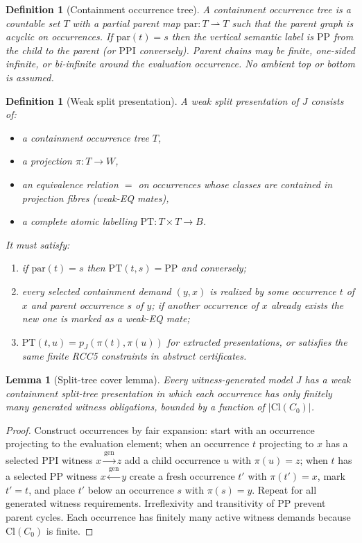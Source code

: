 \documentclass[11pt]{article}
\newcommand{\PP}{\mathrm{PP}}
\newcommand{\PPI}{\mathrm{PPI}}
\newcommand{\Cl}{\mathrm{Cl}}
\newtheorem{lemma}[theorem]{Lemma}
\newtheorem{definition}[theorem]{Definition}
\begin{document}
\begin{definition}[Containment occurrence tree]
A containment occurrence tree is a countable set $T$ with a partial parent map
$\mathrm{par}:T\rightharpoonup T$ such that the parent graph is acyclic on
occurrences. If $\mathrm{par}(t)=s$ then the vertical semantic label is
$\PP$ from the child to the parent (or $\PPI$ conversely).
Parent chains may be finite, one-sided infinite, or bi-infinite around the
evaluation occurrence. No ambient top or bottom is assumed.
\end{definition}

\begin{definition}[Weak split presentation]
A weak split presentation of $J$ consists of:
\begin{itemize}
  \item a containment occurrence tree $T$,
  \item a projection $\pi:T\to W$,
  \item an equivalence relation $=$ on occurrences whose classes are contained
    in projection fibres (weak-EQ mates),
  \item a complete atomic labelling $\mathrm{PT}:T\times T\to B$.
\end{itemize}
It must satisfy:
\begin{enumerate}[label=(S\arabic*)]
  \item if $\mathrm{par}(t)=s$ then $\mathrm{PT}(t,s)=\PP$ and conversely;
  \item every selected containment demand $(y,x)$ is realized by some occurrence
    $t$ of $x$ and parent occurrence $s$ of $y$; if another occurrence of $x$
    already exists the new one is marked as a weak-EQ mate;
  \item $\mathrm{PT}(t,u)=p_J(\pi(t),\pi(u))$ for extracted presentations, or
    satisfies the same finite RCC5 constraints in abstract certificates.
\end{enumerate}
\end{definition}

\begin{lemma}[Split-tree cover lemma]
\label{lem:split-tree-cover}
Every witness-generated model $J$ has a weak containment split-tree
presentation in which each occurrence has only finitely many generated witness
obligations, bounded by a function of $|\Cl(C_0)|$.
\end{lemma}

\begin{proof}
Construct occurrences by fair expansion: start with an occurrence projecting
to the evaluation element; when an occurrence $t$ projecting to $x$ has a
selected $\PPI$ witness $x\overset{\mathrm{gen}}{\to} z$ add a child occurrence
$u$ with $\pi(u)=z$; when $t$ has a selected $\PP$ witness
$x\overset{\mathrm{gen}}{\leftarrow} y$ create a fresh occurrence $t'$ with
$\pi(t')=x$, mark $t'=t$, and place $t'$ below an occurrence $s$ with
$\pi(s)=y$. Repeat for all generated witness requirements. Irreflexivity and
transitivity of $\PP$ prevent parent cycles. Each occurrence has finitely
many active witness demands because $\Cl(C_0)$ is finite.
\end{proof}
\end{document}
